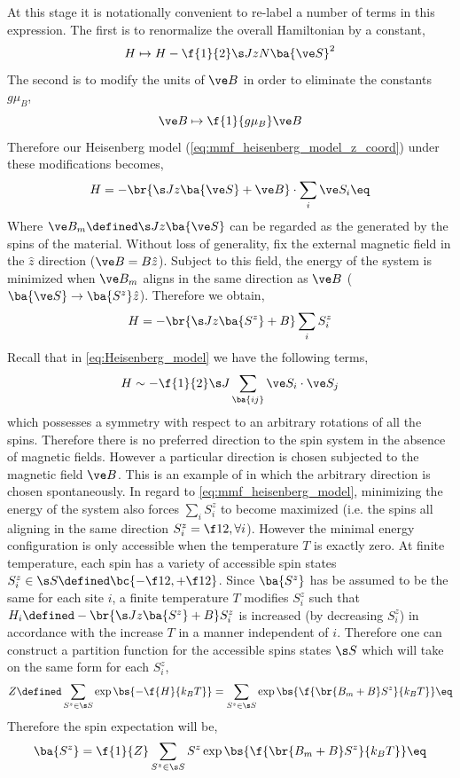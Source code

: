 \documentclass{article}
\begin{document}
At this stage it is notationally convenient to re-label a number of terms in this expression. The first is to renormalize the overall Hamiltonian by a constant,
\[ H \mapsto H - \f{1}{2}\s J zN \ba{\ve S}^2  \]
The second is to modify the units of $\ve B$ in order to eliminate the constants $g \mu_B$,
\[ \ve B \mapsto \f{1}{g \mu_{B}} \ve B \]
Therefore our Heisenberg model (\cref{eq:mmf_heisenberg_model_z_coord}) under these modifications becomes,
\[ H = - \br{\s J z \ba{\ve S} + \ve B} \cdot \sum_{i} \ve S_i \eq \label{eq:mmf_heisenberg_model} \]
Where $\ve B_m \defined \s J z \ba{\ve S}$ can be regarded as the  generated by the spins of the material. Without loss of generality, fix the external magnetic field in the $\hat z$ direction ($\ve B = B \hat z$). Subject to this field, the energy of the system is minimized when $\ve B_m$ aligns in the same direction as $\ve B$ ($\ba{\ve S} \to \ba{S^z}\hat z$). Therefore we obtain,
\[ H = - \br{\s J z \ba{S^z} + B} \sum_{i} S_i^z \]
Recall that in \cref{eq:Heisenberg_model} we have the following terms,
\[ H \sim - \f{1}{2}\s J \sum_{\ba{ij}} \ve S_i \cdot \ve S_j \]
which possesses a symmetry with respect to an arbitrary rotations of all the spins. Therefore there is no preferred direction to the spin system in the absence of magnetic fields. However a particular direction is chosen subjected to the magnetic field $\ve B$. This is an example of  in which the arbitrary direction is chosen spontaneously. In regard to \cref{eq:mmf_heisenberg_model}, minimizing the energy of the system also forces $\sum_i S_i^z$ to become maximized (i.e. the spins all aligning in the same direction $S_i^z = \f12, \forall i$). However the minimal energy configuration is only accessible when the temperature $T$ is exactly zero. At finite temperature, each spin has a variety of accessible spin states $S_i^{z} \in \s S \defined \bc{-\f12, +\f12}$. Since $\ba{S^z}$ has be assumed to be the same for each site $i$, a finite temperature $T$ modifies $S_i^{z}$ such that $H_i \defined - \br{\s J z \ba{S^z} + B} S_i^z$ is increased (by decreasing $S_i^{z}$) in accordance with the increase $T$ in a manner independent of $i$. Therefore one can construct a partition function for the accessible spins states $\s S$ which will take on the same form for each $S_i^z$,
\[ Z \defined \sum_{S^z \in \s S} \exp\bs{-\f{H}{k_BT}} = \sum_{S^z \in \s S} \exp\bs{\f{\br{B_m + B} S^{z}}{k_BT}} \eq \label{eq:partition}\]
Therefore the spin expectation will be,
\[ \ba{S^z} = \f{1}{Z} \sum_{S^z \in \s S} S^z \exp\bs{\f{\br{B_m + B} S^{z}}{k_BT}} \eq \label{eq:partition_expectation}\]
\end{document}
